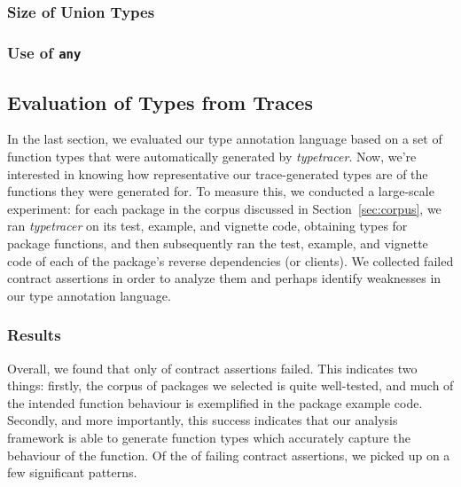 \documentclass[acmsmall,review,anonymous]{acmart}\settopmatter{printfolios=true,printccs=false,printacmref=false}
\newcommand{\code}[1]{{\lstinline[style=Rin]!#1!}\xspace}
\newcommand{\typetracer}{\emph{typetracer}\xspace} %
\begin{document}
%
%
\subsubsection{Size of Union Types}

%
%
\subsubsection{Use of \code{any}}
\label{subsec:any}

%
%
%
%
\subsection{Evaluation of Types from Traces}
\label{subsec:eval}


In the last section, we evaluated our type annotation language based on a set of function types that were automatically generated by \typetracer.
Now, we're interested in knowing how representative our trace-generated types are of the functions they were generated for.
To measure this, we conducted a large-scale experiment: for each package in the corpus discussed in Section~\ref{sec:corpus}, we ran \typetracer on its test, example, and vignette code, obtaining types for package functions, and then subsequently ran the test, example, and vignette code of each of the package's reverse dependencies (or clients).
We collected failed contract assertions in order to analyze them and perhaps identify weaknesses in our type annotation language.

%
%
\subsubsection{Results}


Overall, we found that only  of contract assertions failed.
This indicates two things: firstly, the corpus of packages we selected is quite well-tested, and much of the intended function behaviour is exemplified in the package example code. 
Secondly, and more importantly, this success indicates that our analysis framework is able to generate function types which accurately capture the behaviour of the function. 
Of the  of failing contract assertions, we picked up on a few significant patterns.
\end{document}
